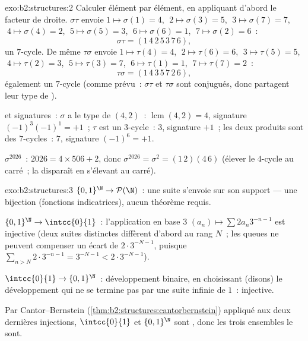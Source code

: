 \begin{solution}{exo:b2:structures:2}
Calculer élément par élément, en appliquant d'abord le facteur de
droite. $\sigma\tau$ envoie $1 \mapsto \sigma(1) = 4$, $\;2 \mapsto
\sigma(3) = 5$, $\;3 \mapsto \sigma(7) = 7$, $\;4 \mapsto \sigma(4) =
2$, $\;5 \mapsto \sigma(5) = 3$, $\;6 \mapsto \sigma(6) = 1$, $\;7
\mapsto \sigma(2) = 6$~:
\[
\sigma\tau = (1\,4\,2\,5\,3\,7\,6),
\]
un $7$-cycle. De même $\tau\sigma$ envoie $1 \mapsto \tau(4) = 4$,
$\;2 \mapsto \tau(6) = 6$, $\;3 \mapsto \tau(5) = 5$, $\;4 \mapsto
\tau(2) = 3$, $\;5 \mapsto \tau(3) = 7$, $\;6 \mapsto \tau(1) = 1$,
$\;7 \mapsto \tau(7) = 2$~:
\[
\tau\sigma = (1\,4\,3\,5\,7\,2\,6),
\]
également un $7$-cycle (comme prévu~: $\sigma\tau$ et $\tau\sigma$ sont
conjugués, donc partagent leur type de ).

 et signatures~: $\sigma$ a le type de  $(4,2)$~: 
$\operatorname{lcm}(4,2) = 4$, signature $(-1)^3(-1)^1 = +1$~; $\tau$
est un $3$-cycle~:  $3$, signature $+1$~; les deux produits sont
des $7$-cycles~:  $7$, signature $(-1)^6 = +1$.

$\sigma^{2026}$~: $2026 = 4 \times 506 + 2$, donc $\sigma^{2026} =
\sigma^2 = (1\,2)(4\,6)$ (élever le $4$-cycle au carré~; la
 disparaît en s'élevant au carré).
\end{solution}

\begin{solution}{exo:b2:structures:3}
$\{0,1\}^{\N} \to \mathcal{P}(\N)$~: une suite s'envoie sur son support
--- une bijection (fonctions indicatrices), aucun théorème requis.

$\{0,1\}^{\N} \to \intcc{0}{1}$~: l'application en base $3$ $(a_n)
\mapsto \sum 2a_n 3^{-n-1}$ est injective (deux suites distinctes
diffèrent d'abord au rang $N$~; les queues ne peuvent compenser un
écart de $2\cdot 3^{-N-1}$, puisque $\sum_{n > N} 2\cdot 3^{-n-1} =
3^{-N-1} < 2\cdot3^{-N-1}$).

$\intcc{0}{1} \to \{0,1\}^{\N}$~: développement binaire, en choisissant
(disons) le développement qui ne se termine pas par une suite infinie
de $1$~: injective.

Par Cantor--Bernstein (\cref{thm:b2:structures:cantorbernstein})
appliqué aux deux dernières injections, $\intcc{0}{1}$ et
$\{0,1\}^{\N}$ sont , donc les trois ensembles le sont.
\end{solution}

